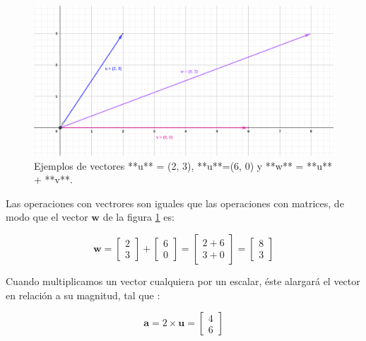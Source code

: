 \documentclass[
]{book}
\begin{document}
\begin{figure}

{\centering \includegraphics{Unidad-II/Vectores} 

}

\caption{Ejemplos de vectores **u** = (2, 3), **u**=(6, 0) y **w** = **u** + **v**.}\label{fig:vectores}
\end{figure}

Las operaciones con vectrores son iguales que las operaciones con matrices, de modo que el vector \(\mathbf{w}\) de la figura \ref{fig:vectores} es:

\[\mathbf{w} =\left[
\begin{array}{c}
2 \\ 3
\end{array}
\right]  + 
\left[
\begin{array}{c}
6 \\ 0
\end{array}
\right] = 
\left[
\begin{array}{c}
2 + 6 \\ 3 +0
\end{array}
\right] =
\left[
\begin{array}{c}
8 \\ 3
\end{array}
\right]\]

Cuando multiplicamos un vector cualquiera por un escalar, éste alargará el vector en relación a su magnitud, tal que :

\[
\mathbf{a} = 2 \times \mathbf{u} = \left[ \begin{array}{c} 4 \\ 6 \end{array} \right]
\]
\end{document}
